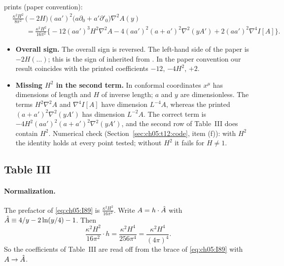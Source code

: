 \begin{discbox}
\PI{} prints (paper convention):
\begin{equation*}
\begin{aligned}
&\frac{\kappa^2H^2}{8\pi^2}\,\big(-2H\big)(aa')^2\big(a\partial_0+a'\partial'_0\big)\nabla^2A(y)\\
&\qquad=\frac{\kappa^2H^2}{16\pi^2}\Big\{-12(aa')^3H^2\nabla^2A-4(aa')^2(a+a')^2\nabla^2(yA')+2(aa')^2\nabla^4I[A]\Big\}.
\end{aligned}
\end{equation*}
\begin{itemize}[leftmargin=12pt]
\item \textbf{Overall sign.} The overall sign is reversed. The left-hand side of the paper is $-2H(\ldots)$; this is the sign of  inherited from .
In the paper convention our result coincides with the printed coefficients $-12$, $-4H^2$, $+2$.
\item \textbf{Missing $H^2$ in the second term.} In conformal coordinates $x^\mu$ has dimensions of length and $H$ of inverse length; $a$ and $y$ are dimensionless.
The terms $H^2\nabla^2A$ and $\nabla^4I[A]$ have dimension $L^{-4}A$, whereas the printed $(a+a')^2\nabla^2(yA')$ has dimension $L^{-2}A$.
The correct term is $-4H^2(aa')^2(a+a')^2\nabla^2(yA')$, and the second row of Table~III does contain $H^2$.
Numerical check (Section~\ref{sec:ch05:t12:code}, item (f)): with $H^2$ the identity  holds at every point tested; without $H^2$ it fails for $H\neq1$.
\end{itemize}
\end{discbox}

\subsection[Table III]{Table III \tD}
\label{sec:ch05:t12:tab3}

\paragraph{Normalization.}
The prefactor of \eqref{eq:ch05:I89} is $\frac{\kappa^2H^2}{16\pi^2}$. Write $A=h\cdot\hat A$ with $\hat A\equiv4/y-2\ln(y/4)-1$. Then
\begin{equation*}
\frac{\kappa^2H^2}{16\pi^2}\cdot h=\frac{\kappa^2H^4}{256\pi^4}=\frac{\kappa^2H^4}{(4\pi)^4}.
\end{equation*}
So the coefficients of Table~III are read off from the brace of \eqref{eq:ch05:I89} with $A\to\hat A$.

